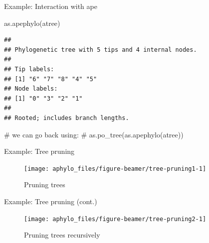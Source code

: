 \documentclass[9pt,ignorenonframetext,]{beamer}
\newenvironment{Shaded}{\begin{snugshade}}{\end{snugshade}}
\newcommand{\KeywordTok}[1]{\textcolor[rgb]{0.94,0.87,0.69}{#1}}
\newcommand{\CommentTok}[1]{\textcolor[rgb]{0.50,0.62,0.50}{#1}}
\newcommand{\NormalTok}[1]{\textcolor[rgb]{0.80,0.80,0.80}{#1}}
\begin{document}
\begin{frame}[fragile,t]{Example: Interaction with ape}

\footnotesize

\begin{Shaded}
\begin{Highlighting}[]
\KeywordTok{as.apephylo}\NormalTok{(atree)}
\end{Highlighting}
\end{Shaded}

\begin{verbatim}
## 
## Phylogenetic tree with 5 tips and 4 internal nodes.
## 
## Tip labels:
## [1] "6" "7" "8" "4" "5"
## Node labels:
## [1] "0" "3" "2" "1"
## 
## Rooted; includes branch lengths.
\end{verbatim}

\begin{Shaded}
\begin{Highlighting}[]
\CommentTok{# we can go back using:}
\CommentTok{# as.po_tree(as.apephylo(atree))}
\end{Highlighting}
\end{Shaded}

\normalsize

\end{frame}

\begin{frame}[t]{Example: Tree pruning}

\footnotesize

\begin{figure}

{\centering \texttt{[image: aphylo\_files/figure-beamer/tree-pruning1-1]} 

}

\caption{Pruning trees}\label{fig:tree-pruning1}
\end{figure}

\normalsize

\end{frame}

\begin{frame}[t]{Example: Tree pruning (cont.)}

\footnotesize

\begin{figure}

{\centering \texttt{[image: aphylo\_files/figure-beamer/tree-pruning2-1]} 

}

\caption{Pruning trees recursively}\label{fig:tree-pruning2}
\end{figure}

\normalsize

\end{frame}
\end{document}
